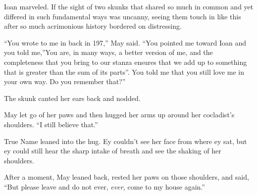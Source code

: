 Ioan marveled. If the sight of two skunks that shared so much in common and yet differed in such fundamental ways was uncanny, seeing them touch in like this after so much acrimonious history bordered on distressing.

``You wrote to me in back in 197,'' May said. ``You pointed me toward Ioan and you told me,''You are, in many ways, a better version of me, and the completeness that you bring to our stanza ensures that we add up to something that is greater than the sum of its parts''. You told me that you still love me in your own way. Do you remember that?''

The skunk canted her ears back and nodded.

May let go of her paws and then hugged her arms up around her cocladist's shoulders. ``I still believe that.''

True Name leaned into the hug. Ey couldn't see her face from where ey sat, but ey could still hear the sharp intake of breath and see the shaking of her shoulders.

After a moment, May leaned back, rested her paws on those shoulders, and said, ``But please leave and do not ever, \emph{ever,} come to my house again.''
